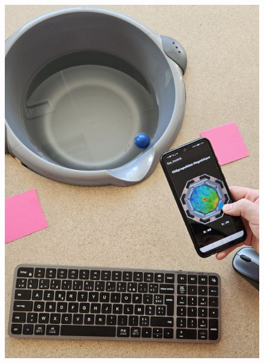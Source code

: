 \documentclass{article}
\begin{document}
\begin{figure}[H]
    \centering
    \begin{minipage}{0.32\textwidth}
    \centering
        \includegraphics[width=\linewidth, angle=0]{Images/photoFabrications/final (1).jpg}
    \end{minipage}\hfill
    \begin{minipage}{0.32\textwidth}
    \centering

\end{minipage}
\end{figure}
\end{document}
